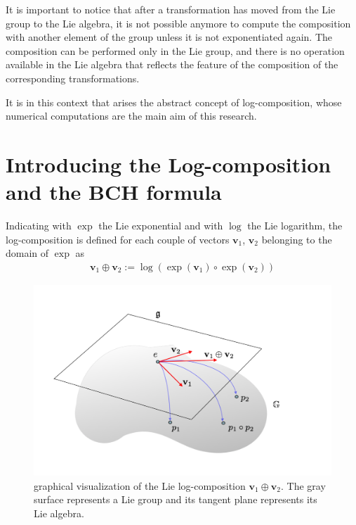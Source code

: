 It is important to notice that after a transformation has moved from the Lie group to the Lie algebra, it is not possible anymore to compute the composition with another element of the group unless it is not exponentiated again. The composition can be performed only in the Lie group, and there is no operation available in the Lie algebra that reflects the feature of the composition of the corresponding transformations.

It is in this context that arises the abstract concept of log-composition, whose numerical computations are the main aim of this research.


\section{Introducing the Log-composition and the BCH formula}

% 
Indicating with $\exp$ the Lie exponential  and with $\log$ the Lie logarithm, the log-composition is defined for each couple of vectors $\mathbf{v}_1$, $\mathbf{v}_2$ belonging to the domain of $\exp$ as
\begin{align}\label{eq:bch_problem}
\mathbf{v}_1 \oplus \mathbf{v}_2 := \log(\exp(\mathbf{v}_1)\circ\exp(\mathbf{v}_2))
\end{align}

\begin{figure}[!ht]
	\centering
	\includegraphics[scale=0.35]{figures/log_composition.pdf}
	\caption{graphical visualization of the Lie log-composition $\mathbf{v}_{1}\oplus \mathbf{v}_{2}$. The gray surface represents a Lie group and its tangent plane represents its Lie algebra. }
	\label{fig:composition}
\end{figure}

